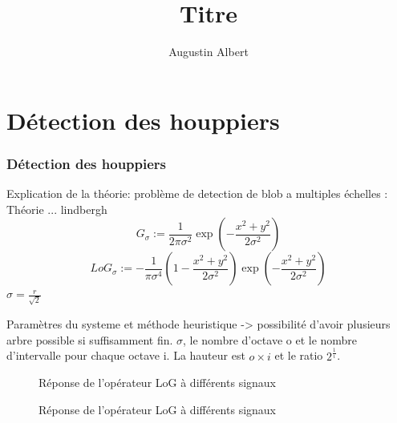 \documentclass{beamer}
\title{Titre}
\author{Augustin Albert}
\begin{document}
\begin{frame}
	\titlepage
\end{frame}
\begin{frame}
	\tableofcontents
\end{frame}

\section{Détection des houppiers}

\begin{frame}
	\frametitle{Détection des houppiers}
	Explication de la théorie: problème de detection de blob a multiples échelles : Théorie ... lindbergh
	\[G_{\sigma}:=\frac{1}{2\pi\sigma^{2}}\exp(-\frac{x^{2}+y^{2}}{2\sigma^{2}})\]
	\[{LoG}_{\sigma}:=-\frac{1}{\pi\sigma^{4}}(1-\frac{x^{2}+y^{2}}{2\sigma^{2}})\exp(-\frac{x^{2}+y^{2}}{2\sigma^{2}})\] 
	$\sigma=\frac{r}{\sqrt{2}}$
\end{frame}

\begin{frame}
	Paramètres du systeme et méthode heuristique -> possibilité d'avoir plusieurs arbre possible si suffisamment fin.
	$\sigma$, le nombre d'octave o et le nombre d'intervalle pour chaque octave i. La hauteur est $o \times i$ et le ratio $2^{\frac{1}{i}}$. 
\end{frame}

\begin{frame}
	\begin{figure}
		\subfloat[Réponse à un créneau pour $\sigma=1$, $\sigma=2$ et $\sigma=3$]{\scalebox{0.3}{}}
		\caption{Réponse de l'opérateur LoG à différents signaux}
	\end{figure}
\end{frame}

\begin{frame}
	\begin{figure}
		\subfloat[Réponses à des créneaux pour $\sigma=1$]{\scalebox{0.3}{}}
		\caption{Réponse de l'opérateur LoG à différents signaux}
	\end{figure}
\end{frame}
\end{document}
